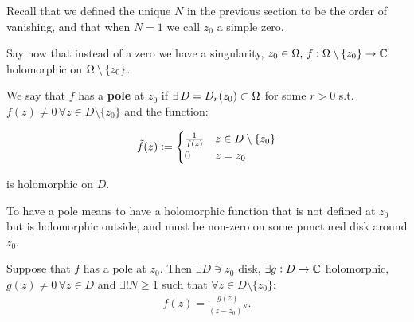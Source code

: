 Recall that we defined the unique $N$ in the previous section to be the order of vanishing, and that when $N=1$ we call $z_0$ a simple zero.


Say now that instead of a zero we have a singularity, $z_0 \in \Omega , \, f: \Omega \setminus \{ z_0 \} \to \mathbb{C}$ holomorphic on $\Omega \setminus \{ z_0 \}$.


\begin{center}
\end{center}



\begin{definition}[Poles]
We say that $f$ has a \textbf{pole} at $z_0$ if $\exists \, D = D_r(z_0) \subset \Omega$ for some $r>0$ s.t. $f(z) \neq 0 \, \forall z \in D \setminus \{ z_0 \}$ and the function:

\begin{align*}
    \Tilde{f}(z) \vcentcolon = \begin{cases} \frac{1}{f(z)} & z \in D \setminus \{ z_0 \} \\ 0 & z = z_0  \end{cases}
\end{align*}

is holomorphic on $D$.

\end{definition}

To have a pole means to have a holomorphic function that is not defined at $z_0$  but is holomorphic outside, and must be non-zero on some punctured disk around $z_0$.



\begin{lemma}\label{lem:pole-lemma}
Suppose that $f$ has a pole at $z_0$. Then $\exists D \ni z_0$ disk, $\exists g: D \to \mathbb{C} $ holomorphic, $g(z) \neq 0 \, \forall z \in D$ and $\exists ! N \geq 1$ such that $\forall z\in D \setminus \{ z_0 \}$:
\begin{align*}
f(z) = \frac{g(z)}{(z-z_0)^N}.
\end{align*}

\end{lemma}

